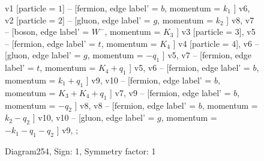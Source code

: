 \documentclass{revtex4}
\begin{document}
\begin{figure}[!htb]
\begin{center}
{    %
v1 [particle = \(1\)] -- [fermion, edge label' = \(b\), momentum = \(k_{1}\) ] v6, 
v2 [particle = \(2\)] -- [gluon, edge label' = \(g\), momentum = \(k_{2}\) ] v8, 
v7 -- [boson, edge label' = \(W^{-}\), momentum = \(K_{3}\) ] v3 [particle = \(3\)], 
v5 -- [fermion, edge label' = \(t\), momentum = \(K_{4}\) ] v4 [particle = \(4\)], 
v6 -- [gluon, edge label' = \(g\), momentum = \(-q_{1}\) ] v5, 
v7 -- [fermion, edge label' = \(t\), momentum = \(K_{4} + q_{1}\) ] v5, 
v6 -- [fermion, edge label' = \(b\), momentum = \(k_{1} + q_{1}\) ] v9, 
v10 -- [fermion, edge label' = \(b\), momentum = \(K_{3} + K_{4} + q_{1}\) ] v7, 
v9 -- [fermion, edge label' = \(b\), momentum = \(-q_{2}\) ] v8, 
v8 -- [fermion, edge label' = \(b\), momentum = \(k_{2} - q_{2}\) ] v10, 
v10 -- [gluon, edge label' = \(g\), momentum = \(-k_{1} - q_{1} - q_{2}\) ] v9, 
};
\end{center}
\caption{Diagram254, Sign: 1, Symmetry factor: 1}
\end{figure}
\newpage
\end{document}

